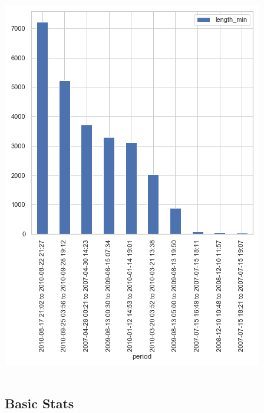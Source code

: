\documentclass[10pt]{beamer}
\begin{document}
\begin{frame}
\begin{columns}[c]
\bigskip
{
    \centering
    \includegraphics[width=\textwidth,height=\textheight,keepaspectratio]{missing_periods.png}
    \par
}
\bigskip

\end{columns}


\end{frame}

\subsection{Basic Stats}
\end{document}
